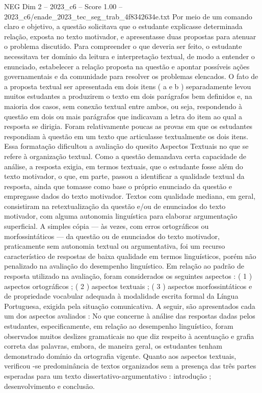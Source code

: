 \begin{textsample}{NEG Dim 2 – 2023\_c6 – Score 1.00 – 2023\_c6/enade\_2023\_tec\_seg\_trab\_4f8342634e.txt}
Por meio de um comando claro e objetivo, a questão solicitava que o estudante explicasse determinada relação, exposta no texto motivador, e apresentasse duas propostas para atenuar o problema discutido.
Para compreender o que deveria ser feito, o estudante necessitava ter domínio da leitura e interpretação textual, de modo a entender o enunciado, estabelecer a relação proposta na questão e apontar possíveis ações governamentais e da comunidade para resolver os problemas elencados.
O fato de a proposta textual ser apresentada em dois itens ( a e b ) separadamente levou muitos estudantes a produzirem o texto em dois parágrafos bem definidos e, na maioria dos casos, sem conexão textual entre ambos, ou seja, respondendo à questão em dois ou mais parágrafos que indicavam a letra do item ao qual a resposta se dirigia.
Foram relativamente poucas as provas em que os estudantes respondiam à questão em um texto que articulasse textualmente os dois itens.
Essa formatação dificultou a avaliação do quesito Aspectos Textuais no que se refere à organização textual.
Como a questão demandava certa capacidade de análise, a resposta exigia, em termos textuais, que o estudante fosse além do texto motivador, o que, em parte, passou a identificar a qualidade textual da resposta, ainda que tomasse como base o próprio enunciado da questão e empregasse dados do texto motivador.
Textos com qualidade mediana, em geral, consistiram na retextualização da questão e/ou de enunciados do texto motivador, com alguma autonomia linguística para elaborar argumentação superficial.
A simples cópia — às vezes, com erros ortográficos ou morfossintáticos — da questão ou de enunciados do texto motivador, praticamente sem autonomia textual ou argumentativa, foi um recurso característico de respostas de baixa qualidade em termos linguísticos, porém não penalizado na avaliação do desempenho linguístico.
Em relação ao padrão de resposta utilizado na avaliação, foram considerados os seguintes aspectos : ( 1 ) aspectos ortográficos ; ( 2 ) aspectos textuais ; ( 3 ) aspectos morfossintáticos e de propriedade vocabular adequada à modalidade escrita formal da Língua Portuguesa, exigida pela situação comunicativa.
A seguir, são apresentados cada um dos aspectos avaliados : No que concerne à análise das respostas dadas pelos estudantes, especificamente, em relação ao desempenho linguístico, foram observados muitos deslizes gramaticais no que diz respeito à acentuação e grafia correta das palavras, embora, de maneira geral, os estudantes tenham demonstrado domínio da ortografia vigente.
Quanto aos aspectos textuais, verificou -se predominância de textos organizados sem a presença das três partes esperadas para um texto dissertativo-argumentativo : introdução ; desenvolvimento e conclusão.

\end{textsample}
